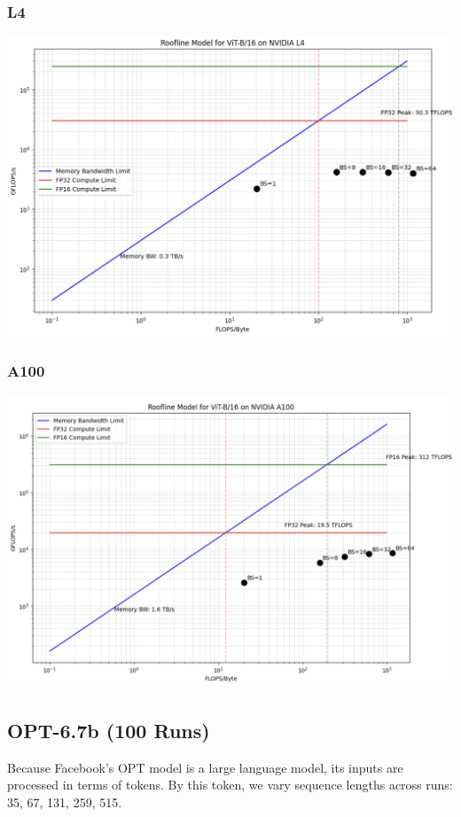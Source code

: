\documentclass[11pt]{article}
\begin{document}
\subsubsection*{L4}
\includegraphics[width=14cm]{vit/vit_l4.png}
\subsubsection*{A100}
\includegraphics[width=14cm]{vit/vit_a100.png}

\subsection*{OPT-6.7b (100 Runs)}
Because Facebook's OPT model is a large language model, its inputs are processed in terms of tokens. By this token, we vary sequence lengths across runs: 35, 67, 131, 259, 515.
\end{document}
